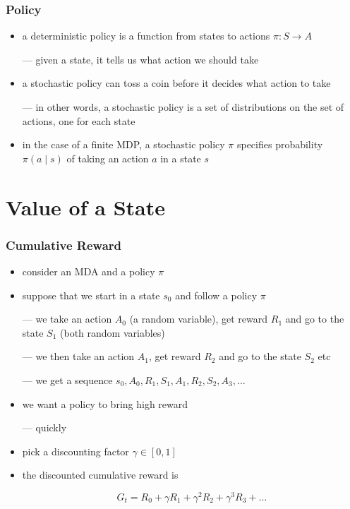 \begin{frame}\frametitle{Policy}
\begin{itemize}

\item a deterministic policy is a function from states to actions
    $\pi: S\to A$

--- given a state, it tells us what action we should take

\item a stochastic policy can toss a coin before it decides what
action to take

--- in other words, a stochastic policy is a set of distributions on
    the set of actions, one for each state

\item in the case of a finite MDP, a stochastic policy $\pi$ specifies
    probability $\pi(a\mid s)$ of taking an action $a$ in a state $s$

\end{itemize}
\end{frame}



\section{Value of a State}

\begin{frame}\frametitle{Cumulative Reward}
\begin{itemize}

\item consider an MDA and a policy $\pi$

\item suppose that we start in a state $s_0$ and follow a policy $\pi$

--- we take an action $A_0$ (a random variable), get reward $R_1$ and
    go to the state $S_1$ (both random variables)

--- we then take an action $A_1$, get reward $R_2$ and
    go to the state $S_2$ etc

--- we get a sequence $s_0, A_0, R_1, S_1, A_1, R_2, S_2, A_3,\ldots$ 

\item we want a policy to bring high reward

--- quickly

\item pick a discounting factor $\gamma\in [0,1]$

\item the \alert{discounted cumulative reward} is

$$G_t = R_0 + \gamma R_1 +\gamma^2 R_2 + \gamma^3 R_3+\ldots$$

\end{itemize}
\end{frame}



